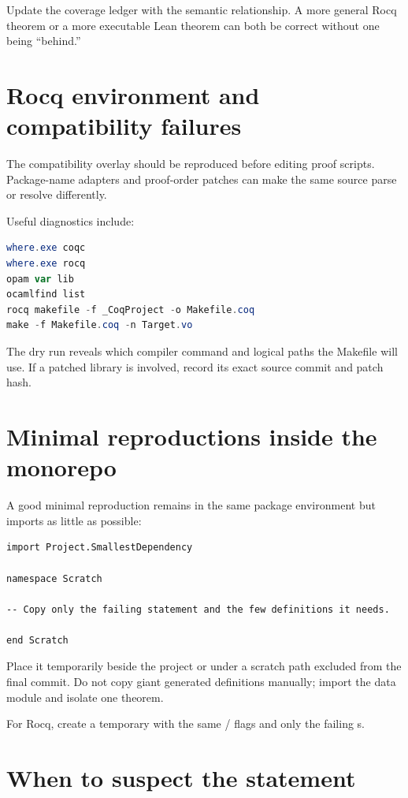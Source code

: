 \documentclass[
  10pt,
  a4paper,
  twoside,
  open=any,
  parskip=half,
  headings=big
]{scrreprt}
\newcommand{\code}[1]{\texttt{\detokenize{#1}}}
\begin{document}
Update the coverage ledger with the semantic relationship.  A more general
Rocq theorem or a more executable Lean theorem can both be correct without one
being ``behind.''

\section{Rocq environment and compatibility failures}

The compatibility overlay should be reproduced before editing proof scripts.
Package-name adapters and proof-order patches can make the same source parse or
resolve differently.

Useful diagnostics include:

\begin{lstlisting}[language=PowerShell]
where.exe coqc
where.exe rocq
opam var lib
ocamlfind list
rocq makefile -f _CoqProject -o Makefile.coq
make -f Makefile.coq -n Target.vo
\end{lstlisting}

The dry run reveals which compiler command and logical paths the Makefile will
use.  If a patched library is involved, record its exact source commit and
patch hash.

\section{Minimal reproductions inside the monorepo}

A good minimal reproduction remains in the same package environment but
imports as little as possible:

\begin{lstlisting}[language=Lean]
import Project.SmallestDependency

namespace Scratch

-- Copy only the failing statement and the few definitions it needs.

end Scratch
\end{lstlisting}

Place it temporarily beside the project or under a scratch path excluded from
the final commit.  Do not copy giant generated definitions manually; import
the data module and isolate one theorem.

For Rocq, create a temporary \code{Scratch.v} with the same \code{-Q}/\code{-R}
flags and only the failing \code{Require Import}s.

\section{When to suspect the statement}
\end{document}
